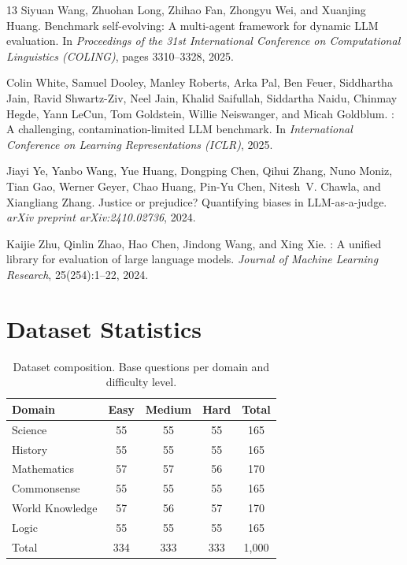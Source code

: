 \documentclass{article}
\begin{document}
\begin{thebibliography}{13}
Siyuan Wang, Zhuohan Long, Zhihao Fan, Zhongyu Wei, and Xuanjing Huang.
\newblock Benchmark self-evolving: A multi-agent framework for dynamic {LLM} evaluation.
\newblock In \emph{Proceedings of the 31st International Conference on Computational Linguistics (COLING)}, pages 3310--3328, 2025.

Colin White, Samuel Dooley, Manley Roberts, Arka Pal, Ben Feuer, Siddhartha Jain, Ravid Shwartz-Ziv, Neel Jain, Khalid Saifullah, Siddartha Naidu, Chinmay Hegde, Yann LeCun, Tom Goldstein, Willie Neiswanger, and Micah Goldblum.
: A challenging, contamination-limited {LLM} benchmark.
\newblock In \emph{International Conference on Learning Representations (ICLR)}, 2025.

Jiayi Ye, Yanbo Wang, Yue Huang, Dongping Chen, Qihui Zhang, Nuno Moniz, Tian Gao, Werner Geyer, Chao Huang, Pin-Yu Chen, Nitesh~V. Chawla, and Xiangliang Zhang.
\newblock Justice or prejudice? {Q}uantifying biases in {LLM}-as-a-judge.
\newblock \emph{arXiv preprint arXiv:2410.02736}, 2024.

Kaijie Zhu, Qinlin Zhao, Hao Chen, Jindong Wang, and Xing Xie.
: A unified library for evaluation of large language models.
\newblock \emph{Journal of Machine Learning Research}, 25(254):1--22, 2024.

\end{thebibliography}

\newpage
\appendix

\section{Dataset Statistics}
\label{app:dataset}

\begin{table}[h]
\caption{Dataset composition. Base questions per domain and difficulty level.}
\label{tab:dataset}
\centering
\begin{tabular}{lcccc}
\toprule
Domain & Easy & Medium & Hard & Total \\
\midrule
Science & 55 & 55 & 55 & 165 \\
History & 55 & 55 & 55 & 165 \\
Mathematics & 57 & 57 & 56 & 170 \\
Commonsense & 55 & 55 & 55 & 165 \\
World Knowledge & 57 & 56 & 57 & 170 \\
Logic & 55 & 55 & 55 & 165 \\
\midrule
Total & 334 & 333 & 333 & 1,000 \\
\bottomrule
\end{tabular}
\end{table}
\end{document}
